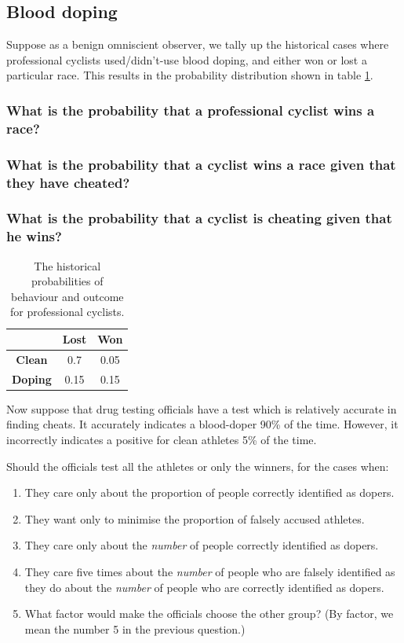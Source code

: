 \documentclass[11pt,fullpage]{book}
\begin{document}
\subsection{Blood doping}
Suppose as a benign omniscient observer, we tally up the historical cases where professional cyclists used/didn't-use blood doping, and either won or lost a particular race. This results in the probability distribution shown in table \ref{tab:Probability_PS_bloodDoping}.

\subsubsection{What is the probability that a professional cyclist wins a race?}
\subsubsection{What is the probability that a cyclist wins a race given that they have cheated?}
\subsubsection{What is the probability that a cyclist is cheating given that he wins?}

\begin{table}[htbp]
  \centering
    \begin{tabular}{ccc}
    \toprule
          & \textbf{Lost} & \textbf{Won} \\
    \midrule
    \textbf{Clean} & 0.7   & 0.05 \\
    \textbf{Doping} & 0.15  & 0.15 \\
    \bottomrule
    \end{tabular}%
    \caption{The historical probabilities of behaviour and outcome for professional cyclists.}
  \label{tab:Probability_PS_bloodDoping}%
\end{table}%

Now suppose that drug testing officials have a test which is relatively accurate in finding cheats. It accurately indicates a blood-doper 90\% of the time. However, it incorrectly indicates a positive for clean athletes 5\% of the time. 

Should the officials test all the athletes or only the winners, for the cases when:

\begin{enumerate}
\item They care only about the proportion of people correctly identified as dopers.
\item They want only to minimise the proportion of falsely accused athletes.
\item They care only about the \textit{number} of people correctly identified as dopers.
\item They care five times about the \textit{number} of people who are falsely identified as they do about the \textit{number} of people who are correctly identified as dopers.
\item What factor would make the officials choose the other group? (By factor, we mean the number 5 in the previous question.)
\end{enumerate}
\end{document}
